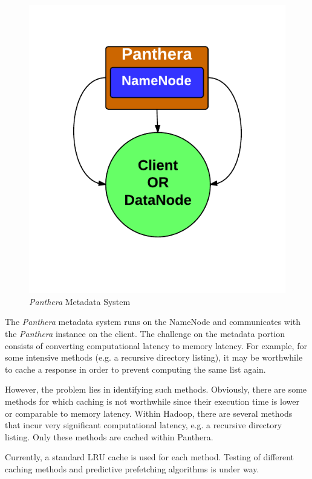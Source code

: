 \documentclass[12pt]{article}
\begin{document}
\begin{figure}[!h]
	\caption{\textit{Panthera} Metadata System}
	\centering
		\includegraphics[scale=0.4]{assets/panthera_meta_architecture.pdf}
\end{figure}

The \textit{Panthera} metadata system runs on the NameNode and communicates with the \textit{Panthera} instance on the client. The challenge on the metadata portion consists of converting computational latency to memory latency. For example, for some intensive methods (e.g. a recursive directory listing), it may be worthwhile to cache a response in order to prevent computing the same list again.

However, the problem lies in identifying such methods. Obviously, there are some methods for which caching is not worthwhile since their execution time is lower or comparable to memory latency. Within Hadoop, there are several methods that incur very significant computational latency, e.g. a recursive directory listing. Only these methods are cached within Panthera.

Currently, a standard LRU cache \cite{cache} is used for each method. Testing of different caching methods and predictive prefetching algorithms \cite{griffioen} is under way.
\end{document}
